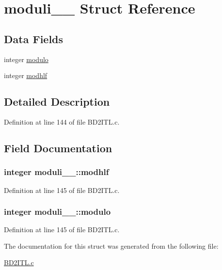 \hypertarget{structmoduli__1__}{}\section{moduli\+\_\+\_\+ Struct Reference}
\label{structmoduli__1__}
\subsection*{Data Fields}
\begin{DoxyCompactItemize}
\item 
integer \hyperlink{structmoduli__1___ad6b1da657815e2fed7358d4be594ba47}{modulo}
\item 
integer \hyperlink{structmoduli__1___a06ee033eea92ce92618971de949ff278}{modhlf}
\end{DoxyCompactItemize}


\subsection{Detailed Description}


Definition at line 144 of file B\+D2\+I\+T\+L.\+c.



\subsection{Field Documentation}
\subsubsection[{\texorpdfstring{modhlf}{modhlf}}]{\setlength{\rightskip}{0pt plus 5cm}integer moduli\+\_\+\_\+\+::modhlf}\hypertarget{structmoduli__1___a06ee033eea92ce92618971de949ff278}{}\label{structmoduli__1___a06ee033eea92ce92618971de949ff278}


Definition at line 145 of file B\+D2\+I\+T\+L.\+c.

\subsubsection[{\texorpdfstring{modulo}{modulo}}]{\setlength{\rightskip}{0pt plus 5cm}integer moduli\+\_\+\_\+\+::modulo}\hypertarget{structmoduli__1___ad6b1da657815e2fed7358d4be594ba47}{}\label{structmoduli__1___ad6b1da657815e2fed7358d4be594ba47}


Definition at line 145 of file B\+D2\+I\+T\+L.\+c.



The documentation for this struct was generated from the following file\+:\begin{DoxyCompactItemize}
\item 
\hyperlink{BD2ITL_8c}{B\+D2\+I\+T\+L.\+c}\end{DoxyCompactItemize}
